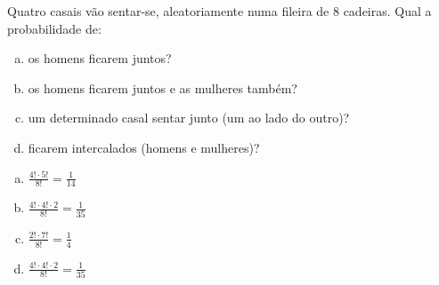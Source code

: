 \begin{ex}
 	Quatro casais vão sentar-se, aleatoriamente numa fileira de 8 cadeiras. Qual a probabilidade de:
    \begin{enumerate}[(a)]
    \item os homens ficarem juntos?
    \item os homens ficarem juntos e as mulheres também?
    \item um determinado casal sentar junto (um ao lado do outro)?
    \item ficarem intercalados (homens e mulheres)?
    \end{enumerate}
      \begin{sol}
        \phantom{A}
        \begin{enumerate}  [(a)]
         \item $\frac{4!\cdot5!}{8!}=\frac{1}{14}$
         \item $\frac{4!\cdot4!\cdot2}{8!}=\frac{1}{35}$
         \item $\frac{2!\cdot7!}{8!}=\frac{1}{4}$
         \item $\frac{4!\cdot4!\cdot2}{8!}=\frac{1}{35}$ 
          \end{enumerate}
      \end{sol}
\end{ex}